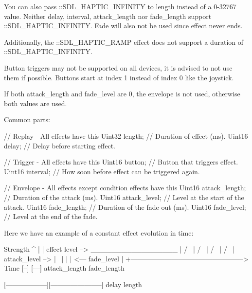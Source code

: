 You can also pass \+::\+S\+D\+L\+\_\+\+H\+A\+P\+T\+I\+C\+\_\+\+I\+N\+F\+I\+N\+I\+T\+Y to length instead of a 0-\/32767 value. Neither delay, interval, attack\+\_\+length nor fade\+\_\+length support \+::\+S\+D\+L\+\_\+\+H\+A\+P\+T\+I\+C\+\_\+\+I\+N\+F\+I\+N\+I\+T\+Y. Fade will also not be used since effect never ends.

Additionally, the \+::\+S\+D\+L\+\_\+\+H\+A\+P\+T\+I\+C\+\_\+\+R\+A\+M\+P effect does not support a duration of \+::\+S\+D\+L\+\_\+\+H\+A\+P\+T\+I\+C\+\_\+\+I\+N\+F\+I\+N\+I\+T\+Y.

Button triggers may not be supported on all devices, it is advised to not use them if possible. Buttons start at index 1 instead of index 0 like the joystick.

If both attack\+\_\+length and fade\+\_\+level are 0, the envelope is not used, otherwise both values are used.

Common parts\+: 
\begin{DoxyCode}
\textcolor{comment}{// Replay - All effects have this}
Uint32 length;        \textcolor{comment}{// Duration of effect (ms).}
Uint16 delay;         \textcolor{comment}{// Delay before starting effect.}

\textcolor{comment}{// Trigger - All effects have this}
Uint16 button;        \textcolor{comment}{// Button that triggers effect.}
Uint16 interval;      \textcolor{comment}{// How soon before effect can be triggered again.}

\textcolor{comment}{// Envelope - All effects except condition effects have this}
Uint16 attack\_length; \textcolor{comment}{// Duration of the attack (ms).}
Uint16 attack\_level;  \textcolor{comment}{// Level at the start of the attack.}
Uint16 fade\_length;   \textcolor{comment}{// Duration of the fade out (ms).}
Uint16 fade\_level;    \textcolor{comment}{// Level at the end of the fade.}
\end{DoxyCode}


Here we have an example of a constant effect evolution in time\+: \begin{DoxyVerb}Strength
^
|
|    effect level -->  _________________
|                     /                 \
|                    /                   \
|                   /                     \
|                  /                       \
| attack_level --> |                        \
|                  |                        |  <---  fade_level
|
+--------------------------------------------------> Time
                   [--]                 [---]
                   attack_length        fade_length

[------------------][-----------------------]
delay               length
\end{DoxyVerb}


